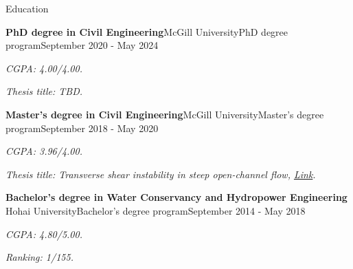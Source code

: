 \documentclass{resume} %
\newcommand{\italicitem}[1]{\item{\textit{#1}}}
\begin{document}



\begin{rSection}{Education}
	
	\begin{rSubsectionNoBullet}{\bf PhD degree in  Civil Engineering}{McGill University}{PhD degree program}{September 2020 - May 2024}
		\italicitem{CGPA:\textit{ 4.00/4.00}.}
		\italicitem{Thesis title: TBD.}
	\end{rSubsectionNoBullet}

    \begin{rSubsectionNoBullet}{\bf Master's degree in  Civil Engineering}{McGill University}{Master's degree program}{September 2018 - May 2020}
        \italicitem{CGPA:\textit{ 3.96/4.00}.}
        \italicitem{Thesis title: \textit{Transverse shear instability in steep open-channel flow}, \href{https://escholarship.mcgill.ca/concern/theses/2n49t6525}{Link}.}
    \end{rSubsectionNoBullet}
    
    \begin{rSubsectionNoBullet}{\bf Bachelor's degree in  Water Conservancy and Hydropower Engineering}{ Hohai University}{Bachelor's degree program}{September 2014 - May 2018}
        \italicitem{CGPA: \textit{4.80/5.00}.}
        \italicitem{Ranking: 1/155.}
    \end{rSubsectionNoBullet}

\end{rSection}
\end{document}
